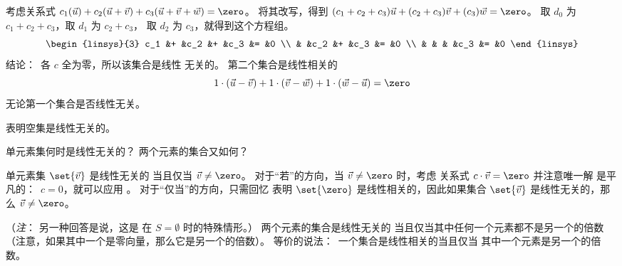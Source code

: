 \begin{exercises}
\begin{answer}
\begin{exparts}
           考虑关系式
           \( c_1(\vec{u})+c_2(\vec{u}+\vec{v})+c_3(\vec{u}+\vec{v}+\vec{w})
           =\zero \)。
           将其改写，得到
           \( (c_1+c_2+c_3)\vec{u}+(c_2+c_3)\vec{v}+(c_3)\vec{w}=\zero \)。
           取 $d_0$ 为 $c_1+c_2+c_3$，取 $d_1$ 为 $c_2+c_3$，
           取 $d_2$ 为 $c_3$，就得到这个方程组。
           \begin{equation*}
             \begin{linsys}{3}
               c_1  &+  &c_2  &+  &c_3  &=  &0  \\
                    &   &c_2  &+  &c_3  &=  &0  \\
                    &   &     &   &c_3  &=  &0
              \end{linsys}
            \end{equation*}
            结论：~各 $c$ 全为零，所以该集合是线性
            无关的。
         \partsitem 第二个集合是线性相关的
            \begin{equation*}
              1\cdot(\vec{u}-\vec{v})
              +1\cdot(\vec{v}-\vec{w})
              +1\cdot(\vec{w}-\vec{u})
              =\zero
            \end{equation*}
            无论第一个集合是否线性无关。
       \end{exparts}
     \end{answer}
  \item
     表明空集是线性无关的。
    \begin{exparts}
      \partsitem 单元素集何时是线性无关的？
      \partsitem 两个元素的集合又如何？
    \end{exparts}
    \begin{answer}
      \begin{exparts}
        \partsitem 单元素集 $\set{\vec{v}}$ 是线性无关的
          当且仅当 $\vec{v}\neq\zero$。
          对于“若”的方向，当 $\vec{v}\neq\zero$ 时，考虑
          关系式
          \( c\cdot\vec{v}=\zero \) 并注意唯一解
          是平凡的：~$c=0$，就可以应用
          。
          对于“仅当”的方向，只需回忆
          表明 $\set{\zero}$ 是线性相关的，因此如果集合
          $\set{\vec{v}}$ 是线性无关的，那么 $\vec{v}\neq\zero$。

          （\textit{注}：
          另一种回答是说，这是
          在 \( S=\emptyset \) 时的特殊情形。）
        \partsitem 两个元素的集合是线性无关的
          当且仅当其中任何一个元素都不是另一个的倍数
          （注意，如果其中一个是零向量，那么它是另一个的倍数）。
          等价的说法：~一个集合是线性相关的当且仅当
          其中一个元素是另一个的倍数。


\end{exparts}
\end{answer}
\end{exercises}

